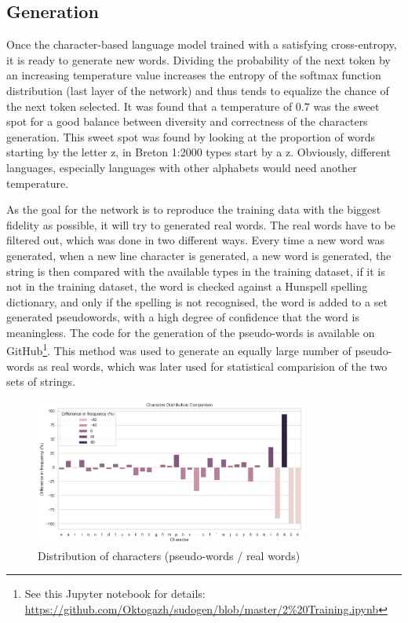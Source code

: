     \subsection{Generation}
Once the character-based language model trained with a satisfying cross-entropy, it is ready to generate new words. Dividing the probability of the next token by an increasing temperature value increases the entropy of the softmax function distribution (last layer of the network) and thus tends to equalize the chance of the next token selected. It was found that a temperature of 0.7 was the sweet spot for a good balance between diversity and correctness of the characters generation. This sweet spot was found by looking at the proportion of words starting by the letter z, in Breton 1:2000 types start by a z. Obviously, different languages, especially languages with other alphabets would need another temperature.

As the goal for the network is to reproduce the training data with the biggest fidelity as possible, it will try to generated real words. The real words have to be filtered out, which was done in two different ways. Every time a new word was generated, when a new line character is generated, a new word is generated, the string is then compared with the available types in the training dataset, if it is not in the training dataset, the word is checked against a Hunspell spelling dictionary, and only if the spelling is not recognised, the word is added to a set generated pseudowords, with a high degree of confidence that the word is meaningless. The code for the generation of the pseudo-words is available on GitHub\footnote{See this Jupyter notebook for details: \url{https://github.com/Oktogazh/sudogen/blob/master/2\%20Training.ipynb}}. This method was used to generate an equally large number of pseudo-words as real words, which was later used for statistical comparision of the two sets of strings.

\begin{figure}[htbp]
    \centering
    \includegraphics[width=0.8\textwidth]{figures/chars.png}
    \caption{Distribution of characters (pseudo-words / real words)}
\end{figure}\label{fig:chars}

